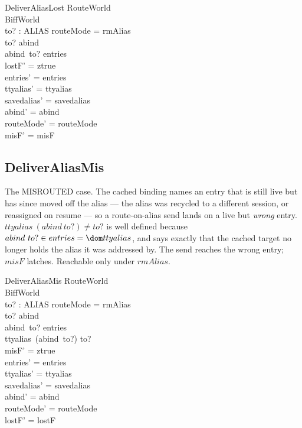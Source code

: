\documentclass[a4paper,10pt,fleqn]{article}
\begin{document}
\begin{schema}{DeliverAliasLost}
  \Delta RouteWorld \\
  \Xi BiffWorld \\
  to? : ALIAS
  \where
  routeMode = rmAlias \\
  to? \in \dom abind \\
  abind~to? \notin entries \\
  lostF' = ztrue \\
  entries' = entries \\
  ttyalias' = ttyalias \\
  savedalias' = savedalias \\
  abind' = abind \\
  routeMode' = routeMode \\
  misF' = misF
\end{schema}

\subsection{DeliverAliasMis}

The MISROUTED case.  The cached binding names an entry that is still live
but has since moved off the alias --- the alias was recycled to a
different session, or reassigned on resume --- so a route-on-alias send
lands on a live but \emph{wrong} entry.  $ttyalias~(abind~to?) \neq to?$
is well defined because $abind~to? \in entries = \dom ttyalias$, and says
exactly that the cached target no longer holds the alias it was addressed
by.  The send reaches the wrong entry; $misF$ latches.  Reachable only
under $rmAlias$.

\begin{schema}{DeliverAliasMis}
  \Delta RouteWorld \\
  \Xi BiffWorld \\
  to? : ALIAS
  \where
  routeMode = rmAlias \\
  to? \in \dom abind \\
  abind~to? \in entries \\
  ttyalias~(abind~to?) \neq to? \\
  misF' = ztrue \\
  entries' = entries \\
  ttyalias' = ttyalias \\
  savedalias' = savedalias \\
  abind' = abind \\
  routeMode' = routeMode \\
  lostF' = lostF
\end{schema}
\end{document}
